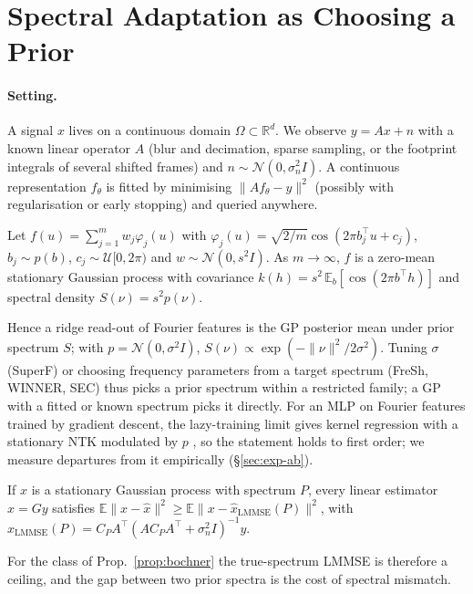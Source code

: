 \section{Spectral Adaptation as Choosing a Prior}\label{sec:setup}

\paragraph{Setting.} A signal $x$ lives on a continuous domain
$\Omega\subset\mathbb{R}^d$. We observe $y=Ax+n$ with a known linear operator
$A$ (blur and decimation, sparse sampling, or the footprint integrals of
several shifted frames) and $n\sim\mathcal{N}(0,\sigma_n^2 I)$. A continuous
representation $f_\theta$ is fitted by minimising $\|Af_\theta-y\|^2$
(possibly with regularisation or early stopping) and queried anywhere.

\begin{proposition}\label{prop:bochner}
Let $f(u)=\sum_{j=1}^m w_j\varphi_j(u)$ with
$\varphi_j(u)=\sqrt{2/m}\cos(2\pi b_j^\top u+c_j)$, $b_j\sim p(b)$,
$c_j\sim\mathcal{U}[0,2\pi)$ and $w\sim\mathcal{N}(0,s^2I)$. As
$m\to\infty$, $f$ is a zero-mean stationary Gaussian process with covariance
$k(h)=s^2\,\mathbb{E}_b[\cos(2\pi b^\top h)]$ and spectral density
$S(\nu)=s^2p(\nu)$.
\end{proposition}
Hence a ridge read-out of Fourier features is the GP posterior mean under
prior spectrum $S$; with $p=\mathcal{N}(0,\sigma^2I)$,
$S(\nu)\propto\exp(-\|\nu\|^2/2\sigma^2)$. Tuning $\sigma$ (SuperF) or
choosing frequency parameters from a target spectrum (FreSh, WINNER, SEC)
thus picks a prior spectrum within a restricted family; a GP with a fitted or
known spectrum picks it directly. For an MLP on Fourier features trained by
gradient descent, the lazy-training limit gives kernel regression with a
stationary NTK modulated by $p$ \citep{tancik2020fourier,jacot2018ntk}, so the
statement holds to first order; we measure departures from it empirically
(\S\ref{sec:exp-ab}).

\begin{proposition}\label{prop:bound}
If $x$ is a stationary Gaussian process with spectrum $P$, every linear
estimator $\hat x=Gy$ satisfies
$\mathbb{E}\|x-\hat x\|^2\ge\mathbb{E}\|x-\hat x_{\mathrm{LMMSE}}(P)\|^2$,
with $\hat x_{\mathrm{LMMSE}}(P)=C_PA^\top(AC_PA^\top+\sigma_n^2I)^{-1}y$.
\end{proposition}
For the class of Prop.~\ref{prop:bochner} the true-spectrum LMMSE is
therefore a ceiling, and the gap between two prior spectra is the cost of
spectral mismatch.

